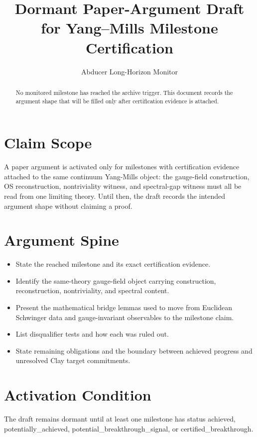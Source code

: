 \documentclass[11pt]{article}
\title{Dormant Paper-Argument Draft for Yang--Mills Milestone Certification}
\author{Abducer Long-Horizon Monitor}
\date{}
\begin{document}
\maketitle

\begin{abstract}

No monitored milestone has reached the archive trigger. This document records the argument shape that will be filled only after certification evidence is attached.

\end{abstract}

\section{Claim Scope}

A paper argument is activated only for milestones with certification evidence attached to the same continuum Yang-Mills object: the gauge-field construction, OS reconstruction, nontriviality witness, and spectral-gap witness must all be read from one limiting theory. Until then, the draft records the intended argument shape without claiming a proof.

\section{Argument Spine}

\begin{itemize}
\item State the reached milestone and its exact certification evidence.
\item Identify the same-theory gauge-field object carrying construction, reconstruction, nontriviality, and spectral content.
\item Present the mathematical bridge lemmas used to move from Euclidean Schwinger data and gauge-invariant observables to the milestone claim.
\item List disqualifier tests and how each was ruled out.
\item State remaining obligations and the boundary between achieved progress and unresolved Clay target commitments.
\end{itemize}

\section{Activation Condition}

The draft remains dormant until at least one milestone has status achieved, potentially\_achieved, potential\_breakthrough\_signal, or certified\_breakthrough.
\end{document}
